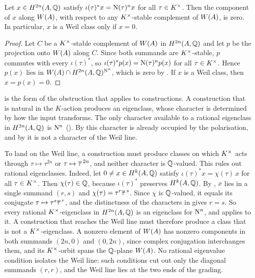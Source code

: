 \begin{corollary}%
\label{cor:equivariant}
Let $x\in H^{2n}(A,\mathbb{Q})$ satisfy $\iota(\tau)^{*}x=\mathrm{N}(\tau)^{n}x$ for all
$\tau\in K^{\times}$. Then the component of $x$ along $W(A)$, with respect to any
$K^{\times}$-stable complement of $W(A)$, is zero. In particular, $x$ is a Weil
class only if $x=0$.
\end{corollary}

\begin{proof}
Let $C$ be a $K^{\times}$-stable complement of $W(A)$ in $H^{2n}(A,\mathbb{Q})$ and let
$p$ be the projection onto $W(A)$ along $C$. Since both summands are
$K^{\times}$-stable, $p$ commutes with every $\iota(\tau)^{*}$, so
$\iota(\tau)^{*}p(x)=\mathrm{N}(\tau)^{n}p(x)$ for all $\tau\in K^{\times}$. Hence $p(x)$
lies in $W(A)\cap H^{2n}(A,\mathbb{Q})^{\mathrm{N}^{n}}$, which is zero by
. If $x$ is a Weil class, then $x=p(x)=0$.
\end{proof}

 is the form of the obstruction that applies to
constructions. A construction that is natural in the $K$-action produces an
eigenclass, whose character is determined by how the input transforms. The
only character available to a rational eigenclass in $H^{2n}(A,\mathbb{Q})$ is
$\mathrm{N}^{n}$ (). By  this character is
already occupied by the polarisation, and by  it is not
a character of the Weil line.

\begin{remark}\label{rem:rightcharacter}
To land on the Weil line, a construction must produce classes on which $K^{\times}$
acts through $\tau\mapsto\tau^{2n}$ or $\tau\mapsto\overline{\tau}^{\,2n}$, and
neither character is $\mathbb{Q}$-valued. This rules out rational eigenclasses.
Indeed, let $0\ne x\in H^{k}(A,\mathbb{Q})$ satisfy $\iota(\tau)^{*}x=\chi(\tau)\,x$
for all $\tau\in K^{\times}$. Then $\chi(\tau)\in\mathbb{Q}$, because $\iota(\tau)^{*}$
preserves $H^{k}(A,\mathbb{Q})$. By , $x$ lies in a single summand
$(r,s)$ and $\chi(\tau)=\tau^{r}\overline{\tau}^{\,s}$. Since $\chi$ is
$\mathbb{Q}$-valued, it equals its conjugate $\tau\mapsto\tau^{s}\overline{\tau}^{\,r}$,
and the distinctness of the characters in  gives $r=s$. So
every rational $K^{\times}$-eigenclass in $H^{2n}(A,\mathbb{Q})$ is an eigenclass for
$\mathrm{N}^{n}$, and  applies to it. A construction that
reaches the Weil line must therefore produce a class that is not a
$K^{\times}$-eigenclass. A nonzero element of $W(A)$ has nonzero components in both
summands $(2n,0)$ and $(0,2n)$, since complex conjugation interchanges them,
and its $K^{\times}$-orbit spans the $\mathbb{Q}$-plane $W(A)$. No rational eigenvalue
condition isolates the Weil line: such conditions cut out only the diagonal
summands $(r,r)$, and the Weil line lies at the two ends of the grading.
\end{remark}

